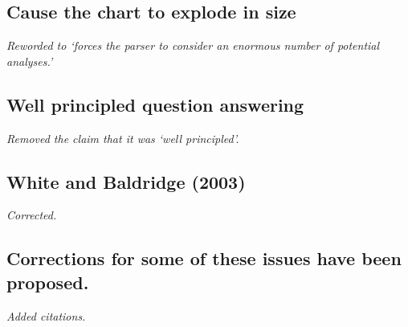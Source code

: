 \subsection{Cause the chart to explode in size}

\emph{Reworded to `forces the parser to consider an enormous number of potential
analyses.'}

\subsection{Well principled question answering}

\emph{Removed the claim that it was `well principled'.}

\subsection{White and Baldridge (2003)}

\emph{Corrected.}

\subsection{Corrections for some of these issues have been proposed.}

\emph{Added citations.}
